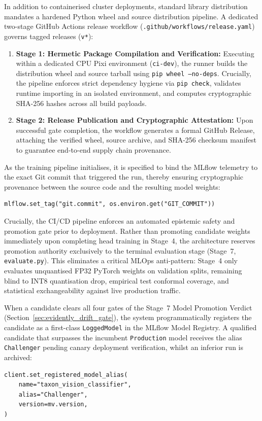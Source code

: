 In addition to containerised cluster deployments, standard library distribution mandates a hardened Python wheel and source distribution pipeline. A dedicated two-stage GitHub Actions release workflow (\nolinkurl{.github/workflows/release.yaml}) governs tagged releases (\texttt{v*}):
\begin{enumerate}
    \item \textbf{Stage 1: Hermetic Package Compilation and Verification:} Executing within a dedicated CPU Pixi environment (\texttt{ci-dev}), the runner builds the distribution wheel and source tarball using \texttt{pip wheel --no-deps}. Crucially, the pipeline enforces strict dependency hygiene via \texttt{pip check}, validates runtime importing in an isolated environment, and computes cryptographic SHA-256 hashes across all build payloads.
    \item \textbf{Stage 2: Release Publication and Cryptographic Attestation:} Upon successful gate completion, the workflow generates a formal GitHub Release, attaching the verified wheel, source archive, and SHA-256 checksum manifest to guarantee end-to-end supply chain provenance.
\end{enumerate}

As the training pipeline initialises, it is specified to bind the MLflow telemetry to the exact Git commit that triggered the run, thereby ensuring cryptographic provenance between the source code and the resulting model weights:
\begin{verbatim}
mlflow.set_tag("git.commit", os.environ.get("GIT_COMMIT"))
\end{verbatim}

Crucially, the CI/CD pipeline enforces an automated epistemic safety and promotion gate prior to deployment. Rather than promoting candidate weights immediately upon completing head training in Stage~4, the architecture reserves promotion authority exclusively to the terminal evaluation stage (Stage~7, \texttt{evaluate.py}). This eliminates a critical MLOps anti-pattern: Stage~4 only evaluates unquantised FP32 PyTorch weights on validation splits, remaining blind to INT8 quantisation drop, empirical test conformal coverage, and statistical exchangeability against live production traffic.

When a candidate clears all four gates of the Stage~7 Model Promotion Verdict (Section~\ref{sec:evidently_drift_gate}), the system programmatically registers the candidate as a first-class \texttt{LoggedModel} in the MLflow Model Registry. A qualified candidate that surpasses the incumbent \texttt{Production} model receives the alias \texttt{Challenger} pending canary deployment verification, whilst an inferior run is archived:
\begin{verbatim}
client.set_registered_model_alias(
    name="taxon_vision_classifier",
    alias="Challenger",
    version=mv.version,
)
\end{verbatim}

